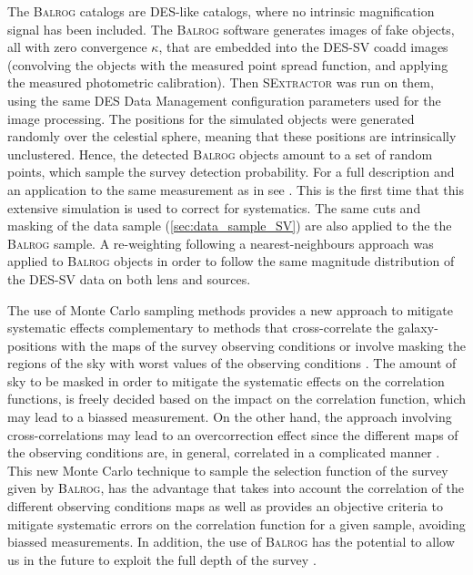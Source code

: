     The {\scshape Balrog} catalogs are DES-like catalogs, where
no intrinsic magnification signal has been included. The {\scshape Balrog} software generates images of fake objects, all with zero convergence $\kappa$, that are embedded into the DES-SV coadd images
(convolving the objects with the measured point spread function, and applying the measured photometric calibration). Then {\scshape SExtractor} was run on them, using the same DES Data Management configuration parameters used for the image processing. The positions for the simulated objects were generated randomly over the celestial sphere, meaning that these positions are intrinsically unclustered. Hence, the detected {\scshape Balrog} objects amount to a set of random points, which sample the survey detection probability. For a full description and an application to the same measurement as in \cite{2016MNRAS.455.4301C} see \cite{2016MNRAS.457..786S}. This is the first time that this extensive simulation is used to correct for systematics. The same cuts and masking of the data sample (\autoref{sec:data_sample_SV}) are also applied to the the {\scshape Balrog} sample. A re-weighting following a nearest-neighbours approach was applied to {\scshape Balrog} objects in order to follow the same magnitude distribution of the DES-SV data on both lens and sources.
    \newline
    
     The use of Monte Carlo sampling methods provides a new approach to mitigate systematic effects complementary to methods that cross-correlate the galaxy-positions with the maps of the survey observing conditions \cite{2012MNRAS.424..564R,2012ApJ...761...14H,2015MNRAS.454.3121M} or involve masking the regions of the sky with worst values of the observing conditions \cite{2016MNRAS.455.4301C}. The amount of sky to be masked in order to mitigate the systematic effects on the correlation functions, is freely decided based on the impact on the correlation function, which may lead to a biassed measurement. On the other hand, the approach involving cross-correlations may lead to an overcorrection effect since the different maps of the observing conditions are, in general, correlated in a complicated manner \cite{2016MNRAS.456.2095E}. This new Monte Carlo technique to sample the selection function of the survey given by {\scshape Balrog}, has the advantage that takes into account the correlation of the different observing conditions maps as well as provides an objective criteria to mitigate systematic errors on the correlation function for a given sample, avoiding biassed measurements. In addition, the use of {\scshape Balrog} has the potential to allow us in the future to exploit the full depth of the survey \cite{2016MNRAS.457..786S}.
\newline

